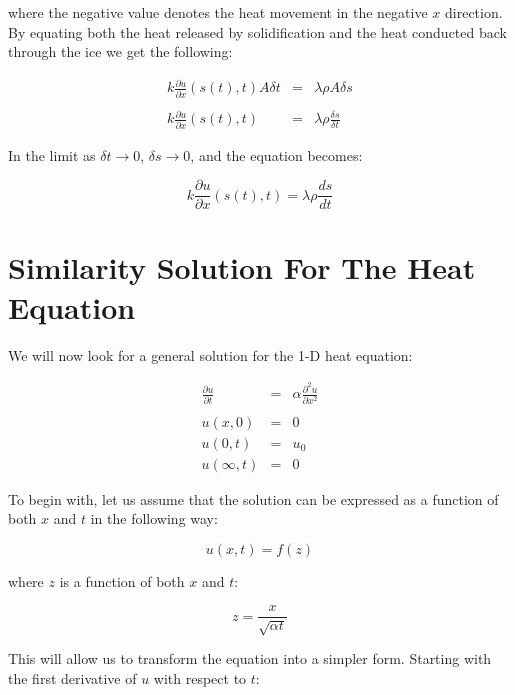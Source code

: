 \documentclass{report}
\begin{document}
where the negative value denotes the heat movement in the negative $x$ direction. By equating both the 
heat released by solidification and the heat conducted back through the ice we get the following:\bigskip

\begin{eqnarray*} 
  k \frac{\partial u}{\partial x} (s(t), t) A \delta t & = & \lambda \rho A \delta s \\\\
             k \frac{\partial u}{\partial x} (s(t), t) & = & \lambda \rho \frac{\delta s}{\delta t}
\end{eqnarray*}\medskip

In the limit as $\delta t \to 0$, $\delta s \to 0$, and the equation becomes:\bigskip

\[ k \frac{\partial u}{\partial x} (s(t), t) = \lambda \rho \frac{d s}{d t} \]\medskip











\section{Similarity Solution For The Heat Equation}

We will now look for a general solution for the 1-D heat equation:\bigskip

\begin{eqnarray*} 
  \frac{\partial u}{\partial t} & = & \alpha \frac{\partial^2 u}{\partial x^2} \\\\
                        u(x, 0) & = & 0 \\
                        u(0, t) & = & u_0 \\
                   u(\infty, t) & = & 0 
\end{eqnarray*}\medskip

To begin with, let us assume that the solution can be expressed as a function of both $x$ and $t$ in the 
following way:\bigskip

\[ u(x, t) = f(z) \]\medskip

where $z$ is a function of both $x$ and $t$:\bigskip

\[ z = \frac{x}{\sqrt{\alpha t}} \]\medskip

This will allow us to transform the equation into a simpler form. Starting with the first derivative of 
$u$ with respect to $t$:\bigskip
\end{document}
